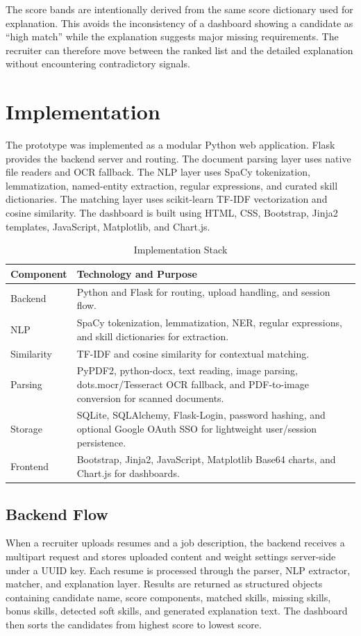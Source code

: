 \documentclass[conference]{IEEEtran}
\begin{document}
The score bands are intentionally derived from the same score dictionary used for explanation. This avoids the inconsistency of a dashboard showing a candidate as ``high match'' while the explanation suggests major missing requirements. The recruiter can therefore move between the ranked list and the detailed explanation without encountering contradictory signals.

\section{Implementation}
The prototype was implemented as a modular Python web application. Flask provides the backend server and routing. The document parsing layer uses native file readers and OCR fallback. The NLP layer uses SpaCy tokenization, lemmatization, named-entity extraction, regular expressions, and curated skill dictionaries. The matching layer uses scikit-learn TF-IDF vectorization and cosine similarity. The dashboard is built using HTML, CSS, Bootstrap, Jinja2 templates, JavaScript, Matplotlib, and Chart.js.

\begin{table}[t]
\centering
\caption{Implementation Stack}
\label{tab:stack}
\small
\begin{tabularx}{\columnwidth}{p{}Y}
\toprule
\textbf{Component} & \textbf{Technology and Purpose}\\
\midrule
Backend & Python and Flask for routing, upload handling, and session flow.\\
NLP & SpaCy tokenization, lemmatization, NER, regular expressions, and skill dictionaries for extraction.\\
Similarity & TF-IDF and cosine similarity for contextual matching.\\
Parsing & PyPDF2, python-docx, text reading, image parsing, dots.mocr/Tesseract OCR fallback, and PDF-to-image conversion for scanned documents.\\
Storage & SQLite, SQLAlchemy, Flask-Login, password hashing, and optional Google OAuth SSO for lightweight user/session persistence.\\
Frontend & Bootstrap, Jinja2, JavaScript, Matplotlib Base64 charts, and Chart.js for dashboards.\\
\bottomrule
\end{tabularx}
\end{table}

\subsection{Backend Flow}
When a recruiter uploads resumes and a job description, the backend receives a multipart request and stores uploaded content and weight settings server-side under a UUID key. Each resume is processed through the parser, NLP extractor, matcher, and explanation layer. Results are returned as structured objects containing candidate name, score components, matched skills, missing skills, bonus skills, detected soft skills, and generated explanation text. The dashboard then sorts the candidates from highest score to lowest score.
\end{document}
